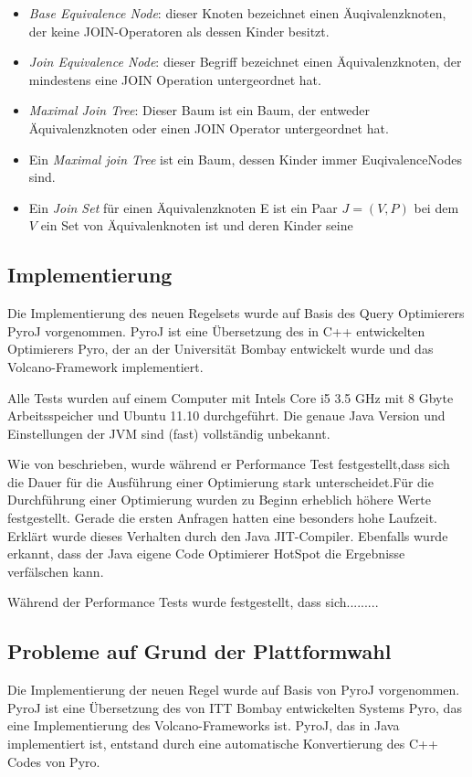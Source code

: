 \begin{itemize}
\item \textit{Base Equivalence Node}: dieser Knoten bezeichnet einen Äuqivalenzknoten, der keine JOIN-Operatoren als dessen Kinder besitzt.
\item \textit{Join Equivalence Node}: dieser Begriff bezeichnet einen Äquivalenzknoten, der mindestens eine JOIN Operation untergeordnet hat.
\item \textit{Maximal Join Tree}: Dieser Baum ist ein Baum, der entweder Äquivalenzknoten oder einen JOIN Operator untergeordnet hat.
\item Ein \textit{Maximal join Tree} ist ein Baum, dessen Kinder immer EuqivalenceNodes sind.
\item Ein \textit{Join Set} für einen Äquivalenzknoten E ist ein Paar $J = (V, P)$ bei dem $V$ ein Set von Äquivalenknoten ist und deren Kinder seine 
\end{itemize}


\subsection{Implementierung}
Die Implementierung des neuen Regelsets wurde auf Basis des Query Optimierers PyroJ vorgenommen. PyroJ ist eine Übersetzung des in C++ entwickelten Optimierers Pyro, der an der Universität Bombay entwickelt wurde und das Volcano-Framework implementiert.

Alle Tests wurden auf einem Computer mit Intels Core i5 3.5 GHz mit 8 Gbyte Arbeitsspeicher und Ubuntu 11.10 durchgeführt. Die genaue Java Version und Einstellungen der JVM sind (fast) vollständig unbekannt.

Wie von \cite{shanbhag2014optimizing} beschrieben, wurde während er Performance Test festgestellt,dass sich die Dauer für die Ausführung einer Optimierung stark unterscheidet.Für die Durchführung einer Optimierung wurden zu Beginn erheblich höhere Werte festgestellt. Gerade die ersten Anfragen hatten eine besonders hohe Laufzeit. Erklärt wurde dieses Verhalten durch den Java \ac{JIT}-Compiler. Ebenfalls wurde erkannt, dass der Java eigene Code Optimierer HotSpot die Ergebnisse verfälschen kann. 

Während der Performance Tests wurde festgestellt, dass sich.........


\subsection{Probleme auf Grund der Plattformwahl}
Die Implementierung der neuen Regel wurde auf Basis von PyroJ vorgenommen. PyroJ ist eine Übersetzung des von ITT Bombay entwickelten Systems Pyro, das eine Implementierung des Volcano-Frameworks ist. PyroJ, das in Java implementiert ist, entstand durch eine automatische Konvertierung des C++ Codes von Pyro. 


